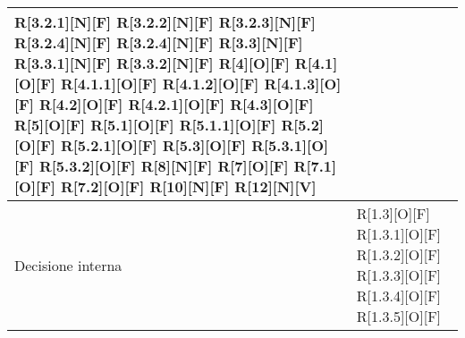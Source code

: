 \begin{longtable}{X | X}
		R[3.2.1][N][F]         \newline
		R[3.2.2][N][F]         \newline
		R[3.2.3][N][F]         \newline
		R[3.2.4][N][F]         \newline
		R[3.2.4][N][F]         \newline
		R[3.3][N][F]           \newline
		R[3.3.1][N][F]         \newline
		R[3.3.2][N][F]         \newline
		R[4][O][F]             \newline
		R[4.1][O][F]	         \newline
		R[4.1.1][O][F]         \newline
		R[4.1.2][O][F]         \newline
		R[4.1.3][O][F]         \newline
		R[4.2][O][F]           \newline
		R[4.2.1][O][F]         \newline
		R[4.3][O][F]           \newline
		R[5][O][F]             \newline
		R[5.1][O][F]	         \newline
		R[5.1.1][O][F]         \newline
		R[5.2][O][F]           \newline
		R[5.2.1][O][F]         \newline
		R[5.3][O][F]           \newline
		R[5.3.1][O][F]         \newline
		R[5.3.2][O][F]         \newline
		R[8][N][F] \newline
		R[7][O][F] \newline
		R[7.1][O][F] \newline
		R[7.2][O][F] \newline
		R[10][N][F] \newline
		R[12][N][V] \newline \\
		\hline
		Decisione interna & 
		R[1.3][O][F]        \newline
		R[1.3.1][O][F]      \newline  
		R[1.3.2][O][F]      \newline  
		R[1.3.3][O][F]      \newline  
		R[1.3.4][O][F]      \newline  
		R[1.3.5][O][F]      \newline  

\end{longtable}
